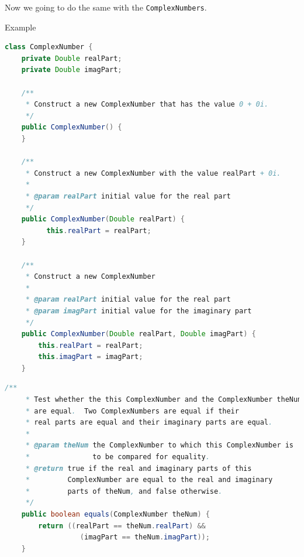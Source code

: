 \documentclass[11pt, xcolor=svgnames]{beamer}
\begin{document}

\begin{frame}
Now we going to do the same with the \texttt{ComplexNumbers}.
\end{frame}


\begin{frame}[fragile]{Example}
\begin{lstlisting}[language=JAVA,basicstyle=\tiny]
class ComplexNumber {
    private Double realPart;
    private Double imagPart;

    /**
     * Construct a new ComplexNumber that has the value 0 + 0i.
     */
    public ComplexNumber() {
    }

    /**
     * Construct a new ComplexNumber with the value realPart + 0i.
     *
     * @param realPart initial value for the real part
     */
    public ComplexNumber(Double realPart) {
	      this.realPart = realPart;
    }

    /**
     * Construct a new ComplexNumber
     *
     * @param realPart initial value for the real part
     * @param imagPart initial value for the imaginary part
     */
    public ComplexNumber(Double realPart, Double imagPart) {
	    this.realPart = realPart;
	    this.imagPart = imagPart;
    }
\end{lstlisting}
\end{frame}



\begin{frame}[fragile]
\begin{lstlisting}[language=JAVA,basicstyle=\tiny]
    /**
     * Test whether the this ComplexNumber and the ComplexNumber theNum
     * are equal.  Two ComplexNumbers are equal if their
     * real parts are equal and their imaginary parts are equal.
     *
     * @param theNum the ComplexNumber to which this ComplexNumber is
     *               to be compared for equality.
     * @return true if the real and imaginary parts of this
     *         ComplexNumber are equal to the real and imaginary
     *         parts of theNum, and false otherwise.
     */
    public boolean equals(ComplexNumber theNum) {
	    return ((realPart == theNum.realPart) &&
		          (imagPart == theNum.imagPart));
    }
\end{lstlisting}
\end{frame}
\end{document}
